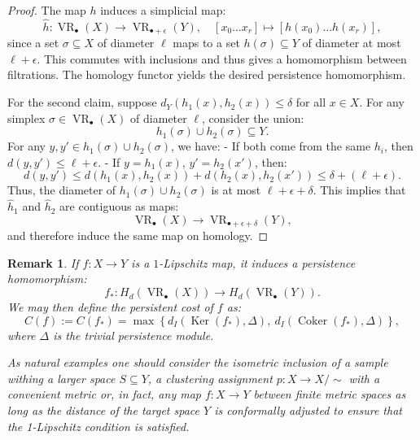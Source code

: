 \documentclass[11pt]{article}
\newtheorem{rem}[thm]{Remark}
\begin{document}
\begin{proof}
The map \( h \) induces a simplicial map:
\[
\hat{h} : \operatorname{VR}_{\bullet}(X) \to \operatorname{VR}_{\bullet+\epsilon}(Y), \quad [x_0 \dots x_r] \mapsto [h(x_0) \dots h(x_r)],
\]
since a set \( \sigma \subseteq X \) of diameter \( \ell \) maps to a set \( h(\sigma) \subseteq Y \) of diameter at most \( \ell + \epsilon \). This commutes with inclusions and thus gives a homomorphism between filtrations. The homology functor yields the desired persistence homomorphism.

For the second claim, suppose \( d_Y(h_1(x), h_2(x)) \leq \delta \) for all \( x \in X \). For any simplex \( \sigma \in \operatorname{VR}_{\bullet}(X) \) of diameter \( \ell \), consider the union:
\[
h_1(\sigma) \cup h_2(\sigma) \subseteq Y.
\]
For any \( y, y' \in h_1(\sigma) \cup h_2(\sigma) \), we have:
- If both come from the same \( h_i \), then \( d(y, y') \leq \ell + \epsilon \).
- If \( y = h_1(x) \), \( y' = h_2(x') \), then:
\[
d(y, y') \leq d(h_1(x), h_2(x)) + d(h_2(x), h_2(x')) \leq \delta + (\ell + \epsilon).
\]
Thus, the diameter of \( h_1(\sigma) \cup h_2(\sigma) \) is at most \( \ell + \epsilon + \delta \). This implies that \( \hat{h}_1 \) and \( \hat{h}_2 \) are contiguous as maps:
\[
\operatorname{VR}_{\bullet}(X) \to \operatorname{VR}_{\bullet+\epsilon+\delta}(Y),
\]
and therefore induce the same map on homology.
\end{proof}


\begin{rem}
If \( f : X \to Y \) is a \( 1 \)-Lipschitz map, it induces a persistence homomorphism:
\[
f_* : H_d(\operatorname{VR}_{\bullet}(X)) \to H_d(\operatorname{VR}_{\bullet}(Y)).
\]
We may then define the \emph{persistent cost} of \( f \) as:
\[
C(f) := C(f_*) = \max\left\{ d_I(\operatorname{Ker}(f_*), \Delta),\ d_I(\operatorname{Coker}(f_*), \Delta) \right\},
\]
where \( \Delta \) is the trivial persistence module.

As natural examples one should consider the isometric inclusion of a sample withing a larger space $S\subseteq Y$, a clustering assignment $p: X\to X/\sim$ with a convenient metric or, in fact, any map $f:X\to Y$ between finite metric spaces as long as the distance of the target space $Y$ is conformally adjusted to ensure that the 1-Lipschitz condition is satisfied. 
\end{rem}


\end{document}
